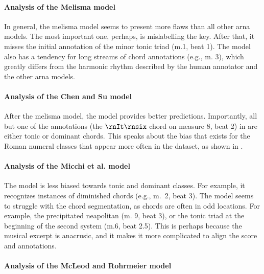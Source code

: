 \paragraph{Analysis of the Melisma model}

In general, the \gls{melisma} model seems to present more
flaws than all other \gls{arna} models. The most important
one, perhaps, is mislabelling the key. After that, it misses
the initial annotation of the minor tonic triad (m.1, beat
1). The model also has a tendency for long streams of chord
annotations (e.g., m. 3), which greatly differs from the
harmonic rhythm described by the human annotator and the
other \gls{arna} models. 

\paragraph{Analysis of the Chen and Su model}

After the \gls{melisma} model, the \textcite{chen2021attend}
model provides better predictions. Importantly, all but one
of the annotations (the $\rnIt\rnsix$ chord on measure 8,
beat 2) in \textcite{chen2021attend} are either tonic or
dominant chords. This speaks about the bias that exists for
the Roman numeral classes that appear more often in the
dataset, as shown in . 

\paragraph{Analysis of the Micchi et al. model}

The \textcite{micchi2021deep} model is less biased towards
tonic and dominant classes. For example, it recognizes
instances of diminished chords (e.g., m.~2, beat 3). The
model seems to struggle with the chord segmentation, as
chords are often in odd locations. For example, the
precipitated \gls{neapolitan} (m. 9, beat 3), or the tonic
triad at the beginning of the second system (m.6, beat 2.5).
This is perhaps because the musical excerpt is anacrusic,
and it makes it more complicated to align the score and
annotations. 

\paragraph{Analysis of the McLeod and Rohrmeier model}

